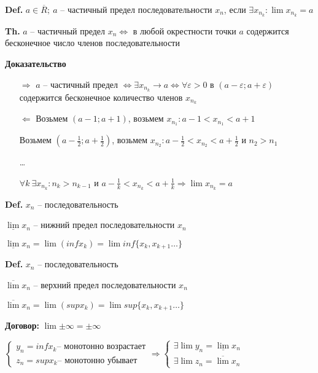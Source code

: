 \documentclass[14pt, letter paper]{article}
\begin{document}
\textbf{Def.} $a \in \overline{R};\ a$ -- частичный предел последовательности $x_n$, если $\exists x_{n_k} : \lim{x_{n_k}} = a$

\textbf{Th.} $a$ -- частичный предел $x_n \Leftrightarrow$ в любой окрестности точки $a$ содержится бесконечное число членов последовательности

\begin{center}
    \textbf{Доказательство}
\end{center}

\begin{itemize}
    \item[$\Rightarrow$] $a$ -- частичный предел $\Leftrightarrow \exists x_{n_k} \rightarrow a \Leftrightarrow \forall \varepsilon > 0$ в $(a - \varepsilon; a + \varepsilon)$ содержится бесконечное количество членов $x_{n_k}$

    \item[$\Leftarrow$] Возьмем $(a-1; a+1)$, возьмем $x_{n_1} : a - 1 < x_{n_1} < a + 1$

    Возьмем $(a - \frac{1}{2}; a + \frac{1}{2})$, возьмем $x_{n_2} : a - \frac{1}{2} < x_{n_2} < a + \frac{1}{2}$ и $n_2 > n_1$

    \ldots

    $\forall k\ \exists x_{n_k} : n_k > n_{k-1}$ и $a - \frac{1}{k} < x_{n_k} < a + \frac{1}{k} \Rightarrow \lim{x_{n_k}} = a$
\end{itemize}

\textbf{Def.} $x_n$ -- последовательность

$\underline{\lim}x_n$ -- нижний предел последовательности $x_n$

$\underline{\lim}x_n = \lim(infx_k) = \lim{inf\{x_k, x_{k+1} \ldots\}}$

\textbf{Def.} $x_n$ -- последовательность

$\overline{\lim}x_n$ -- верхний предел последовательности $x_n$

$\overline{\lim}x_n = \lim(supx_k) = \lim{sup\{x_k, x_{k+1} \ldots\}}$

\textbf{Договор:} $\lim{\pm \infty} = \pm \infty$

$\begin{cases}
    y_n = inf x_k \text{-- монотонно возрастает} \\
    z_n = sup x_k \text{-- монотонно убывает}
\end{cases} \Rightarrow \begin{cases}
    \exists \lim{y_n} = \underline{\lim} x_n \\
    \exists \lim{z_n} = \overline{\lim} x_n
\end{cases}$
\end{document}
